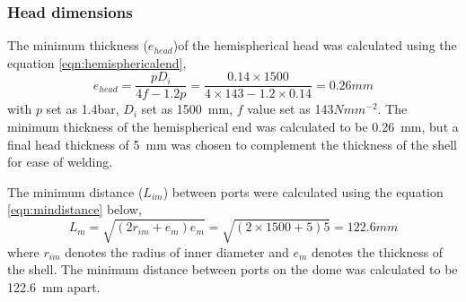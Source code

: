 \subsubsection{Head dimensions}
The minimum thickness ($e_{head}$)of the hemispherical head was calculated using the equation \ref{eqn:hemisphericalend},
\begin{equation}
    e_{head} = \frac{pD_i}{4f-1.2p} = \frac{0.14 \times 1500}{4 \times 143 - 1.2 \times 0.14} = 0.26mm
    \label{eqn:hemisphericalend}
\end{equation}
with $p$ set as 1.4bar, $D_i$ set as \SI{1500}{\milli \metre}, $f$ value set as 143$Nmm^{-2}$.  The minimum thickness of the hemispherical end was calculated to be \SI{0.26}{\milli \metre}, but a final head thickness of \SI{5}{\milli \metre} was chosen to complement the thickness of the shell for ease of welding. 

The minimum distance ($L_{im}$) between ports were calculated using the equation \ref{eqn:mindistance} below,
\begin{equation}
    L_m = \sqrt{(2r_{im}+e_{m})e_m} = \sqrt{(2 \times 1500 + 5)5} = 122.6mm
    \label{eqn:mindistance}
\end{equation}
where $r_{im}$ denotes the radius of inner diameter and $e_m$ denotes the thickness of the shell. The minimum distance between ports on the dome was calculated to be \SI{122.6}{\milli \metre} apart. 


